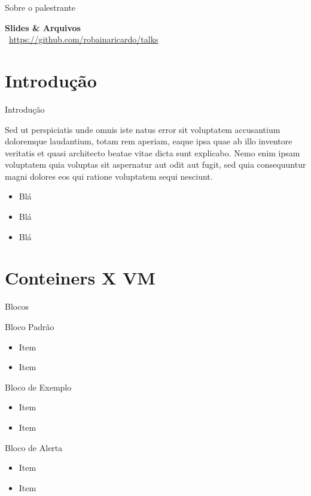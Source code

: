 \documentclass[aspectratio=1610]{beamer}}
\begin{document}
\begin{frame}{Sobre o palestrante}
		\\
		
		\centering
		
		\vskip1cm
		
		\textbf{Slides \& Arquivos } \\
		\faGithub\ \url{https://github.com/robainaricardo/talks}
	
		
	\end{frame}

\section{Introdução}
\begin{frame}{Introdução}
	
	Sed ut perspiciatis unde omnis iste natus error sit voluptatem accusantium doloremque laudantium, totam rem aperiam, eaque ipsa quae ab illo inventore veritatis et quasi architecto beatae vitae dicta sunt explicabo. Nemo enim ipsam voluptatem quia voluptas sit aspernatur aut odit aut fugit, sed quia consequuntur magni dolores eos qui ratione voluptatem sequi nesciunt. 
	
	\begin{itemize}
		\item Blá
		\item Blá
		\item Blá
	\end{itemize}

\end{frame}


\section{Conteiners X VM}

\begin{frame}{Blocos}

	\begin{block}{Bloco Padrão}
		\begin{itemize}
			\item Item
			\item Item
		\end{itemize}
	\end{block}
	
	
	\begin{exampleblock}{Bloco de Exemplo}
		\begin{itemize}
			\item Item
			\item Item
		\end{itemize}
	\end{exampleblock}
	
	\begin{alertblock}{Bloco de Alerta}
		\begin{itemize}
			\item Item
			\item Item
		\end{itemize}
	\end{alertblock}

\end{frame}
\end{document}
